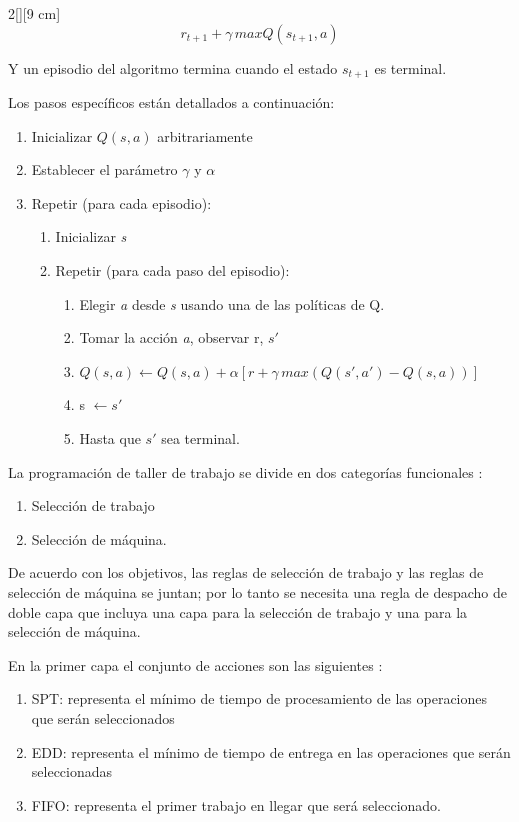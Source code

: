\documentclass[letterpaper, 10 pt]{article}
\begin{document}
\begin{multicols}{2}[][9 cm]
\begin{equation}
	r_{t+1} + \gamma \, max Q(s_{t+1},a)
\end{equation} 

Y un episodio del algoritmo termina cuando el estado $s_{t+1}$ es terminal.

Los pasos específicos están detallados a continuación:

\begin{enumerate}
	\item Inicializar $Q(s,a)$ arbitrariamente
	\item Establecer el parámetro $\gamma$ y $\alpha$
	\item Repetir (para cada episodio):
	\begin{enumerate}[1]
		\item Inicializar \textit{s}
		\item Repetir (para cada paso del episodio):
		\begin{enumerate}[2.1]
			\item Elegir \textit{a} desde \textit{s} usando una de las políticas de Q.
			\item Tomar la acción \textit{a}, observar r, $s'$
			\item $	\displaystyle	Q(s,a) \leftarrow Q(s,a) + \alpha[r + \gamma \, max(Q(s',a') - Q(s,a) )] $
			\item s $\leftarrow s'$ 
			\item Hasta que $s'$ sea terminal.
		\end{enumerate}
	\end{enumerate}
\end{enumerate}

La programación de taller de trabajo se divide en dos categorías funcionales \citep{zhao2019improved}:
\begin{enumerate}
	\item Selección de trabajo
	\item Selección de máquina.
\end{enumerate}
De acuerdo con los objetivos, las reglas de selección de trabajo y las reglas de selección de máquina se juntan; por lo tanto se necesita una regla de despacho de doble capa que incluya una capa para la selección de trabajo y una para la selección de máquina.

En la primer capa el conjunto de acciones son las siguientes \citep{zhao2019improved}:

\begin{enumerate}
	\item SPT: representa el mínimo de tiempo de procesamiento de las operaciones que serán seleccionados
	\item EDD: representa el mínimo de tiempo de entrega en las operaciones que serán seleccionadas
	\item FIFO: representa el primer trabajo en llegar que será seleccionado.
\end{enumerate}


\end{multicols}
\end{document}

